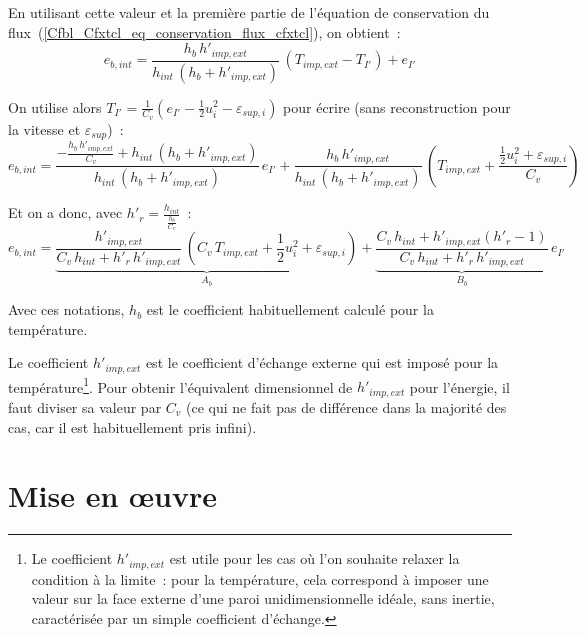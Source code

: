 En utilisant cette valeur et la première partie de l'équation de conservation
du flux~(\ref{Cfbl_Cfxtcl_eq_conservation_flux_cfxtcl}), on obtient~:
\begin{equation}
e_{b,int} = \frac{h_b\,h'_{imp,ext}}{h_{int}\,(h_b+h'_{imp,ext})}\,(T_{imp,ext}-T_{I'})+e_{I'}
\end{equation}

On utilise alors
$\displaystyle T_{I'}=\frac{1}{C_v}\left(e_{I'}-\frac{1}{2}u^2_{i}-\varepsilon_{sup,i}\right)$ pour
écrire (sans reconstruction pour la vitesse et $\varepsilon_{sup}$)~:
\begin{equation}
\displaystyle e_{b,int} =
\frac{ -\frac{h_b\,h'_{imp,ext}}{C_v}+h_{int}\,(h_b+h'_{imp,ext}) }
     { h_{int}\,(h_b+h'_{imp,ext}) } \,e_{I'}
+\frac{h_b\,h'_{imp,ext}}{h_{int}\,(h_b+h'_{imp,ext})}\,
  \left(T_{imp,ext}+\frac{\frac{1}{2}u^2_{i}+\varepsilon_{sup,i}}{C_v}\right)
\end{equation}


Et on a donc, avec $\displaystyle h'_r=\frac{h_{int}}{\frac{h_b}{C_v}}$~:
\begin{equation}
\displaystyle e_{b,int} =
\underbrace{\frac{ h'_{imp,ext} }{ C_v\,h_{int}+h'_r\,h'_{imp,ext} }\,
  \left(C_v\,T_{imp,ext}+\frac{1}{2}u^2_{i}+\varepsilon_{sup,i}\right)}_{A_b}
+\underbrace{\frac{ C_v\,h_{int}+h'_{imp,ext}(h'_r-1) }{ C_v\,h_{int}+h'_r\,h'_{imp,ext} }}_{B_b}\,e_{I'}
\end{equation}

Avec ces notations, $h_b$ est le coefficient habituellement calculé pour la
température.

Le coefficient $h'_{imp,ext}$ est le coefficient d'échange externe qui est
imposé pour la température\footnote{Le coefficient $h'_{imp,ext}$
est utile pour les cas où l'on
souhaite relaxer la condition à la limite~:
pour la température, cela correspond à imposer une valeur sur la face
externe d'une paroi unidimensionnelle idéale, sans inertie,
caractérisée par un simple coefficient d'échange.}.
Pour obtenir l'équivalent dimensionnel de $h'_{imp,ext}$ pour l'énergie,
il faut diviser sa valeur par $C_v$ (ce qui ne fait pas de différence dans
la majorité des cas, car il est habituellement pris infini).

\section*{Mise en \oe uvre}

